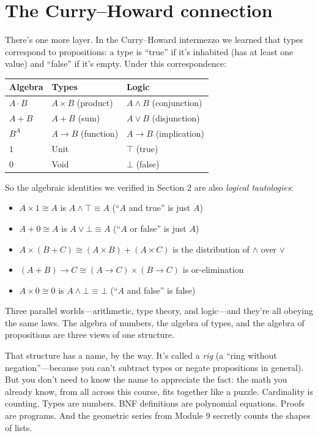 \documentclass[11pt]{article}
\begin{document}
\section{The Curry--Howard connection}

There's one more layer. In the Curry--Howard intermezzo we learned that types correspond to propositions: a type is ``true'' if it's inhabited (has at least one value) and ``false'' if it's empty. Under this correspondence:

\begin{center}
\begin{tabular}{lll}
\toprule
\textbf{Algebra} & \textbf{Types} & \textbf{Logic} \\
\midrule
$A \cdot B$ & $A \times B$ (product) & $A \wedge B$ (conjunction) \\
$A + B$ & $A + B$ (sum) & $A \vee B$ (disjunction) \\
$B^A$ & $A \to B$ (function) & $A \to B$ (implication) \\
$1$ & Unit & $\top$ (true) \\
$0$ & Void & $\bot$ (false) \\
\bottomrule
\end{tabular}
\end{center}

So the algebraic identities we verified in Section 2 are also \emph{logical tautologies}:
\begin{itemize}
  \item $A \times 1 \cong A$ is $A \wedge \top \equiv A$ (``$A$ and true'' is just $A$)
  \item $A + 0 \cong A$ is $A \vee \bot \equiv A$ (``$A$ or false'' is just $A$)
  \item $A \times (B + C) \cong (A \times B) + (A \times C)$ is the distribution of $\wedge$ over $\vee$
  \item $(A + B) \to C \cong (A \to C) \times (B \to C)$ is or-elimination
  \item $A \times 0 \cong 0$ is $A \wedge \bot \equiv \bot$ (``$A$ and false'' is false)
\end{itemize}

Three parallel worlds---arithmetic, type theory, and logic---and they're all obeying the same laws. The algebra of numbers, the algebra of types, and the algebra of propositions are three views of one structure.

That structure has a name, by the way. It's called a \emph{rig} (a ``ring without negation''---because you can't subtract types or negate propositions in general). But you don't need to know the name to appreciate the fact: the math you already know, from all across this course, fits together like a puzzle. Cardinality is counting. Types are numbers. BNF definitions are polynomial equations. Proofs are programs. And the geometric series from Module 9 secretly counts the shapes of lists.
\end{document}
